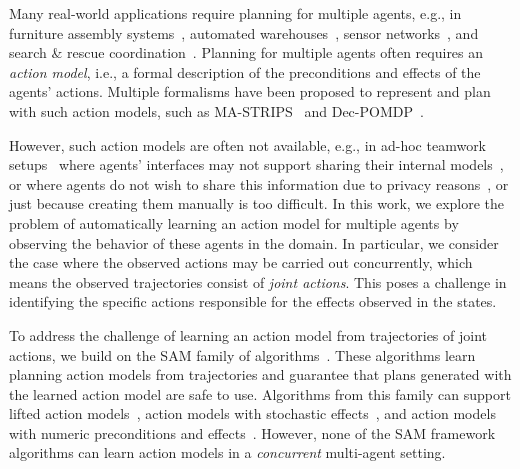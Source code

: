 \documentclass[letterpaper]{article} %
\theoremstyle{definition}
\theoremstyle{remark}
\newcommand{\sam}{\ac{SAM}\xspace}
\newcommand{\roni}[1]{{\textcolor{red}{[Roni: #1]}}}
\begin{document}
Many real-world applications require planning for multiple agents, e.g., in furniture assembly systems~\cite{knepper2013ikeabot}, automated warehouses~\cite{azadeh2019robotized}, sensor networks~\cite{lesser2003distributed}, and search \& rescue coordination~\cite{allouche2010multi}.
Planning for multiple agents often requires an \emph{action model}, i.e., a formal description of the preconditions and effects of the agents' actions.
Multiple formalisms have been proposed to represent and plan with such action models, such as MA-STRIPS~\cite{brafman2013complexity} and Dec-POMDP~\cite{bernstein2002complexity,tambe1997towards}.

However, such action models are often not available, e.g., in ad-hoc teamwork setups~\cite{barrett2012analysis} where agents' interfaces may not support sharing their internal models~\cite{verma2020asking},
or where agents do not wish to share this information due to privacy reasons~\cite{brafman2013complexity,maliah2016collaborative},
or just because creating them manually is too difficult.
In this work, we explore the problem of automatically learning an action model for multiple agents by observing the behavior of these agents in the domain. In particular, we consider the case where the observed actions may be carried out concurrently, which means the observed trajectories consist of \emph{joint actions}.
This poses a challenge in identifying the specific actions responsible for the effects observed in the states.



To address the challenge of learning an action model from trajectories of joint actions, we build on the \sam family of algorithms~\cite{stern2017efficientAndSafe,juba2021safe,juba2022learning,mordoch2023learning}.
These algorithms learn planning action models from trajectories and guarantee that plans generated with the learned action model are safe to use.
Algorithms from this family can support lifted action models~, action models with stochastic effects~, and action models with numeric preconditions and effects~.
However, none of the \sam framework algorithms can learn action models in a \emph{concurrent} multi-agent setting.
\end{document}
